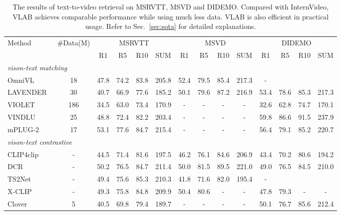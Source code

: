 \documentclass{article}
\begin{document}
\begin{table*}[]
    \small
    \setlength{\tabcolsep}{3.1pt}
    \centering
    \caption{The results of text-to-video retrieval on MSRVTT, MSVD and DIDEMO. Compared with InternVideo, VLAB achieves comparable performance while using much less data. VLAB is also efficient in practical usage. Refer to Sec.~\ref{sec:sota} for detailed explanations.}
    \begin{tabular}{l|c|cccc|cccc|cccc}
        \toprule
\multirow{2}{*}{Method} & \multirow{2}{*}{\#Data(M)}  & \multicolumn{4}{c|}{MSRVTT}     & \multicolumn{4}{c|}{MSVD} &\multicolumn{4}{c}{DIDEMO} \\ \cmidrule(lr){3-14} 
        &                    & R1 & R5 & R10 &SUM & R1 & R5 & R10 &SUM & R1 & R5 &R10  &SUM       \\ 
         \midrule
         \multicolumn{14}{l}{\textit{vison-text matching}}\\


         OmniVL~\cite{wangomnivl}           &18        &47.8 &74.2 &83.8 &205.8 &52.4 &79.5 &85.4 &217.3 &-\\
         LAVENDER~\cite{li2022lavender}     &30        &40.7 &66.9 &77.6 &185.2 &50.1 &79.6 &87.2 &216.9 & 53.4 &78.6 &85.3 &217.3 \\
         VIOLET~\cite{fu2021violet}         &186       &34.5 &63.0 &73.4 &170.9  &-     &-    &-    &- &32.6 &62.8 &74.7 &170.1\\
         VINDLU~\cite{cheng2022vindlu}                             &25       &48.8 &72.4 &82.2 &203.4     &-    &-    &-    &-   &59.8 &86.6 &91.5 &237.9 \\  
         mPLUG-2~\cite{xu2023mplug}                            &17        &53.1 &77.6 &84.7 &215.4     &-    &-    &-    &-  &56.4 &79.1 &85.2 &220.7 \\
         \midrule
         \multicolumn{14}{l}{\textit{vison-text contrastive}}\\
         CLIP4clip~\cite{luo2022clip4clip}  &-         &44.5 &71.4 &81.6 &197.5 &46.2 &76.1 &84.6 &206.9 &43.4 &70.2 &80.6 &194.2\\
         DCR~\cite{wang2022disentangled}    &-         &50.2 &76.5 &84.7 &211.4 &50.0 &81.5 &89.5 &221.0 &49.0 &76.5 &84.5 &210.0\\
         TS2Net~\cite{liu2022ts2}           &-         &49.4 &75.6 &85.3 &210.3 &41.8 &71.6 &82.0 &195.4 &-\\
         X-CLIP~\cite{ma2022x}              &-         &49.3 &75.8 &84.8 &209.9 &50.4 &80.6 &-    &-     &47.8 &79.3 &-    &- \\
         Clover~\cite{huang2022clover}                             &5         &40.5 &69.8 &79.4 &189.7     &-    &-    &-    &-     &50.1 &76.7 &85.6 &212.4 \\


\end{tabular}
\end{table*}
\end{document}
